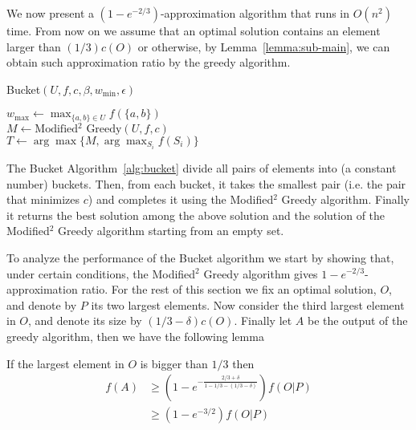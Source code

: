 We now present a $(1-e^{-2/3})$-approximation algorithm that runs in $O(n^2)$ time.
From now on we assume that an optimal solution contains an element larger than $(1/3)c(O)$ or otherwise, by Lemma~\ref{lemma:sub-main}, we can obtain such approximation ratio by the greedy algorithm.

\begin{algorithm}
	\label{alg:bucket}
	\caption{Bucket$(U, f, c, \beta, w_{\min}, \epsilon)$}
	$w_{\max} \leftarrow \max_{\{a, b\} \in U}f(\{a, b\})$
	\\
	$M \leftarrow \text{Modified$^2$ Greedy}(U, f, c)$
	\\
	$T \leftarrow \arg\max\{M, \arg\max_{S_i}f(S_i)\}$
	\\
\end{algorithm}

The Bucket Algorithm~\ref{alg:bucket} divide all pairs of elements into (a constant number) buckets.
Then, from each bucket, it takes the smallest pair (i.e. the pair that minimizes $c$) and completes it using the Modified$^2$ Greedy algorithm.
Finally it returns the best solution among the above solution and the solution of the Modified$^2$ Greedy algorithm starting from an empty set.

To analyze the performance of the Bucket algorithm we start by showing that,  under certain conditions, the Modified$^2$ Greedy algorithm gives $1 - e^{-2/3}$-approximation ratio.
For the rest of this section we fix an optimal solution, $O$, and denote by $P$ its two largest elements.
Now consider the third largest element in $O$, and denote its size by $(1/3 - \delta)c(O)$.
Finally let $A$ be the output of the greedy algorithm, then we have the following lemma

\begin{lemma}
	\label{eq:sub:greedy}
	If the largest element in $O$ is bigger than $1/3$ then
	\begin{align*}
		f(A) & \geq (1-e^{-\frac{2/3 + \delta}{1 - 1/3 - (1/3 - \delta)}})f(O|P)
		\\		& \geq (1 - e^{-3/2})f(O|P)
	\end{align*}
\end{lemma}

